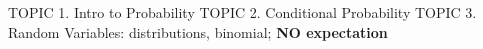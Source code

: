 \documentclass[handout]{mcs}
\begin{document}
\renewcommand{\reading}
{Chapter~\bref{probability_chap}{Intro to Probability};
Chapter~\bref{ran_var_chap}{Random Variables}
}


\begin{staffnotes}
TOPIC 1.  Intro to Probability
TOPIC 2.  Conditional Probability
TOPIC 3.  Random Variables: distributions, binomial; \textbf{NO expectation}
\end{staffnotes}



\end{document}
